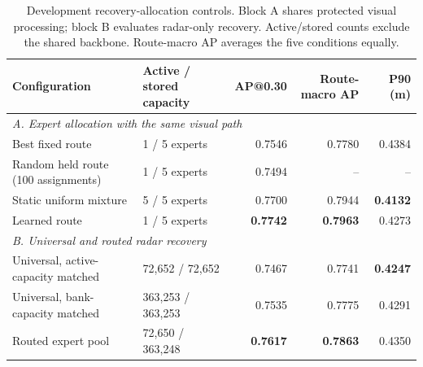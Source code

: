\begin{table}[t]
\centering\small
\caption{Development recovery-allocation controls. Block A shares protected visual processing; block B evaluates radar-only recovery. Active/stored counts exclude the shared backbone. Route-macro AP averages the five conditions equally.}
\label{tab:allocation}
\begin{tabular*}{\textwidth}{@{\extracolsep{\fill}}llrrr@{}}
\toprule
Configuration & Active / stored capacity & AP@0.30 & Route-macro AP & P90 (m)\\
\midrule
\multicolumn{5}{l}{\emph{A. Expert allocation with the same visual path}}\\
Best fixed route &1 / 5 experts&0.7546&0.7780&0.4384\\
Random held route (100 assignments)&1 / 5 experts&0.7494&--&--\\
Static uniform mixture &5 / 5 experts&0.7700&0.7944&\textbf{0.4132}\\
Learned route &1 / 5 experts&\textbf{0.7742}&\textbf{0.7963}&0.4273\\
\midrule
\multicolumn{5}{l}{\emph{B. Universal and routed radar recovery}}\\
Universal, active-capacity matched &72,652 / 72,652&0.7467&0.7741&\textbf{0.4247}\\
Universal, bank-capacity matched &363,253 / 363,253&0.7535&0.7775&0.4291\\
Routed expert pool &72,650 / 363,248&\textbf{0.7617}&\textbf{0.7863}&0.4350\\
\bottomrule
\end{tabular*}
\end{table}
